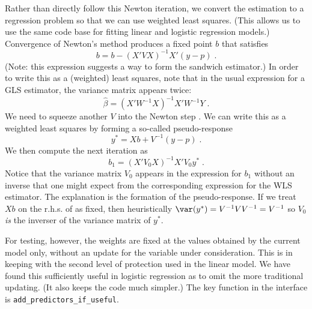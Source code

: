 \documentclass[12pt]{article}
\begin{document}
 Rather than directly follow this Newton iteration, we convert the estimation to
 a regression problem so that we can use weighted least squares.  (This allows
 us to use the same code base for fitting linear and logistic regression
 models.)  Convergence of Newton's method produces a fixed point $b$ that
 satisfies
\begin{displaymath}
  b = b - (X'VX)^{-1}X'(y-p) \;.
\end{displaymath}
 (Note: this expression suggests a way to form the sandwich estimator.) In order
 to write this as a (weighted) least squares, note that in the usual expression
 for a GLS estimator, the variance matrix appears twice:
\begin{displaymath}
  \hat\beta = (X'W^{-1}X)^{-1}X'W^{-1}Y \;.
\end{displaymath}
 We need to squeeze another $V$ into the Newton step .  We can
 write this as a weighted least squares by forming a so-called pseudo-response
\begin{equation}
 y^{*} = Xb + V^{-1}(y-p) \;.
\label{eq:ystar}
\end{equation}
  We then compute the next iteration as
\begin{equation}
  b_1 = (X'V_0X)^{-1}X'V_0y^{*} \;.
\label{eq:irls}
\end{equation}
 Notice that the variance matrix $V_0$ appears in the expression for $b_1$
 without an inverse that one might expect from the corresponding expression for
 the WLS estimator.  The explanation is the formation of the pseudo-response.
  If we treat $Xb$ on the r.h.s. of  as fixed, then heuristically
 $\var(y^{*}) = V^{-1}V V^{-1} = V^{-1}$ so $V_0$ {\em is} the inverser of the
 variance matrix of $y^{*}$.


 For testing, however, the weights are fixed at the values obtained by the
 current model only, without an update for the variable under consideration.
  This is in keeping with the second level of protection used in the linear
 model.  We have found this sufficiently useful in logistic regression as to
 omit the more traditional updating.  (It also keeps the code much simpler.)
  The key function in the interface is {\tt add\_predictors\_if\_useful}.
 
\end{document}
